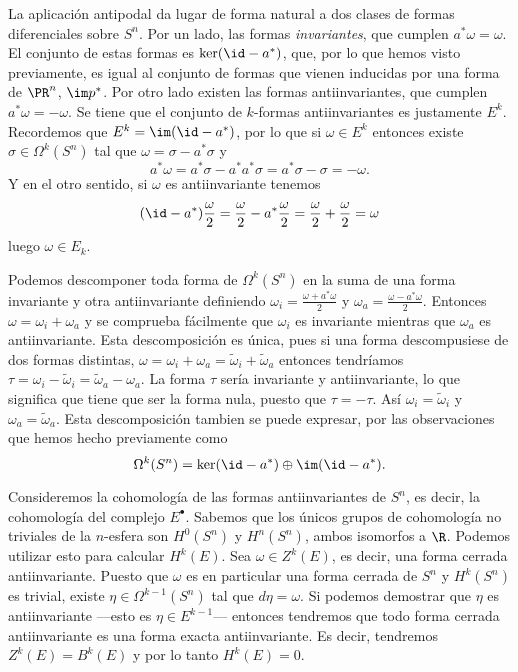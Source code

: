 \documentclass[12pt]{article}
\begin{document}
La aplicación antipodal da lugar de forma natural a dos clases de formas diferenciales
sobre \( S^n \). Por un lado, las formas \emph{invariantes}, que cumplen \( a^\ast \omega
= \omega \). El conjunto de estas formas es \( \ker(\id - a^\ast) \), que, por lo que
hemos visto previamente, es igual al conjunto de formas que vienen inducidas por una forma
de \( \PR^n \), \( \im p^\ast \). Por otro lado existen las formas antiinvariantes, que
cumplen \( a^\ast \omega = -\omega \). Se tiene que el conjunto de \( k \)-formas antiinvariantes
es justamente \( E^k \). Recordemos que \( E^k = \im(\id - a^\ast) \), por lo que si \(
\omega \in E^k \) entonces existe \( \sigma \in \Omega^k(S^n) \) tal que \( \omega =
\sigma - a^\ast \sigma \) y
\begin{equation*}
	a^\ast \omega = a^\ast \sigma - a^\ast a^\ast \sigma = a^\ast \sigma - \sigma =
	-\omega.
\end{equation*}
Y en el otro sentido, si \( \omega \) es antiinvariante tenemos
\begin{equation*}
	(\id - a^\ast)\frac{\omega}{2} = \frac{\omega}{2} - a^\ast \frac{\omega}{2} =
	\frac{\omega}{2} + \frac{\omega}{2} =\omega
\end{equation*}
luego \( \omega \in E_k \).

Podemos descomponer toda forma de \( \Omega^k(S^n) \) en la suma de una forma invariante y
otra antiinvariante definiendo \( \omega_i = \frac{\omega + a^\ast \omega}{2} \) y \(
\omega_a = \frac{\omega - a^\ast \omega}{2} \). Entonces \( \omega = \omega_i + \omega_a
\) y se comprueba fácilmente que \( \omega_i \) es invariante mientras que \( \omega_a \)
es antiinvariante. Esta descomposición es única, pues si una forma descompusiese de dos
formas distintas, \( \omega = \omega_i + \omega_a = \tilde{\omega}_i + \tilde{\omega}_a \)
entonces tendríamos \( \tau = \omega_i - \tilde{\omega}_i = \tilde{\omega}_a - \omega_a
\). La forma \( \tau \) sería invariante y antiinvariante, lo que significa que tiene que
ser la forma nula, puesto que \( \tau = -\tau \). Así \( \omega_i = \tilde{\omega}_i \) y
\( \omega_a = \tilde{\omega}_a \). Esta descomposición tambien se puede
expresar, por las observaciones que hemos hecho previamente como
\begin{equation*}
	\Omega^k(S^n) = \ker(\id - a^\ast) \oplus \im(\id - a^\ast).
\end{equation*}

\parbreak

Consideremos la cohomología de las formas antiinvariantes de \( S^n \), es decir, la
cohomología del complejo \( E^\bullet \). Sabemos que los únicos grupos de cohomología no
triviales de la \( n \)-esfera son \( H^0(S^n) \) y \( H^n(S^n) \), ambos isomorfos a \(
\R \). Podemos utilizar esto para calcular \( H^k(E) \). Sea \( \omega \in Z^k(E) \), es
decir, una forma cerrada antiinvariante. Puesto que \( \omega \) es en particular una
forma cerrada de
\( S^n \) y \( H^k(S^n) \) es trivial, existe \( \eta \in \Omega^{k-1}(S^n) \) tal que \(
d\eta = \omega \). Si podemos demostrar que \( \eta \) es antiinvariante ---esto es \( \eta \in
E^{k-1} \)--- entonces tendremos que todo forma cerrada antiinvariante es una forma
exacta
antiinvariante. Es decir, tendremos \( Z^k(E) = B^k(E) \) y por lo tanto \( H^k(E) = 0 \).  
\end{document}
